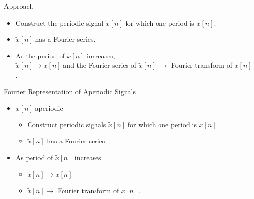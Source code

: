 \begin{frame}{Approach}
    \begin{itemize}
        \item Construct the periodic signal $\tilde{x}[n]$ for which one period is $x[n]$.
        \item $\tilde{x}[n]$ has a Fourier series.
        \item As the period of $\tilde{x}[n]$ increases,\\
            $\tilde{x}[n] \rightarrow x[n]$ and the Fourier series of $\tilde{x}[n]$ $\rightarrow$ Fourier transform of $x[n]$.
    \end{itemize}
\end{frame}



\begin{frame}
    \begin{figure}
        \centering
        
    \end{figure}
\end{frame}


\begin{frame}{Fourier Representation of Aperiodic Signals}
\begin{itemize}
    \item $x[n]$ aperiodic
        \begin{itemize}
          \item Construct periodic signals $\tilde{x}[n]$ for which one period is $x[n]$
          \item $\tilde{x}[n]$ has a Fourier series
        \end{itemize}
    \item As period of $\tilde{x}[n]$ increases
        \begin{itemize}
          \item $\tilde{x}[n] \longrightarrow x[n]$
          \item $\tilde{x}[n] \longrightarrow$ Fourier transform of $x[n]$.
        \end{itemize}
\end{itemize}
\end{frame}

